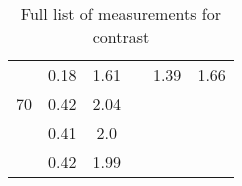 \begin{table}[H]
\begin{tabular}{S[table-format = 2.0] S S S[table-format = 2.0] S S}
		                 & 0.18          & 1.61          &                  & 1.39          & 1.66          \\
		70               & 0.42          & 2.04                                                             \\
		                 & 0.41          & 2.0                                                              \\
		                 & 0.42          & 1.99                                                             \\
		\bottomrule
	\end{tabular}
	\caption{Full list of measurements for contrast}\label{}
\end{table}
